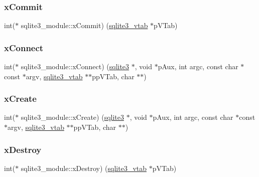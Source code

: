 \mbox{\label{structsqlite3__module_a1d9fa3ed3dd16165cfcda3a532a7a3fc}} 
\subsubsection{\texorpdfstring{xCommit}{xCommit}}
{\footnotesize\ttfamily int($\ast$ sqlite3\+\_\+module\+::x\+Commit) (\mbox{\hyperlink{structsqlite3__vtab}{sqlite3\+\_\+vtab}} $\ast$p\+V\+Tab)}

\mbox{\label{structsqlite3__module_a457fe622b5334195640e3e835c9923a8}} 
\subsubsection{\texorpdfstring{xConnect}{xConnect}}
{\footnotesize\ttfamily int($\ast$ sqlite3\+\_\+module\+::x\+Connect) (\mbox{\hyperlink{sqlite3_8h_a0ef6f2646262c8a9b24368d8ac140f69}{sqlite3}} $\ast$, void $\ast$p\+Aux, int argc, const char $\ast$const  $\ast$argv, \mbox{\hyperlink{structsqlite3__vtab}{sqlite3\+\_\+vtab}} $\ast$$\ast$pp\+V\+Tab, char $\ast$$\ast$)}

\mbox{\label{structsqlite3__module_a5934e38da1222cac999d01d372af293e}} 
\subsubsection{\texorpdfstring{xCreate}{xCreate}}
{\footnotesize\ttfamily int($\ast$ sqlite3\+\_\+module\+::x\+Create) (\mbox{\hyperlink{sqlite3_8h_a0ef6f2646262c8a9b24368d8ac140f69}{sqlite3}} $\ast$, void $\ast$p\+Aux, int argc, const char $\ast$const  $\ast$argv, \mbox{\hyperlink{structsqlite3__vtab}{sqlite3\+\_\+vtab}} $\ast$$\ast$pp\+V\+Tab, char $\ast$$\ast$)}

\mbox{\label{structsqlite3__module_a0ec3414a65bb24f400e8cfd820751412}} 
\subsubsection{\texorpdfstring{xDestroy}{xDestroy}}
{\footnotesize\ttfamily int($\ast$ sqlite3\+\_\+module\+::x\+Destroy) (\mbox{\hyperlink{structsqlite3__vtab}{sqlite3\+\_\+vtab}} $\ast$p\+V\+Tab)}


